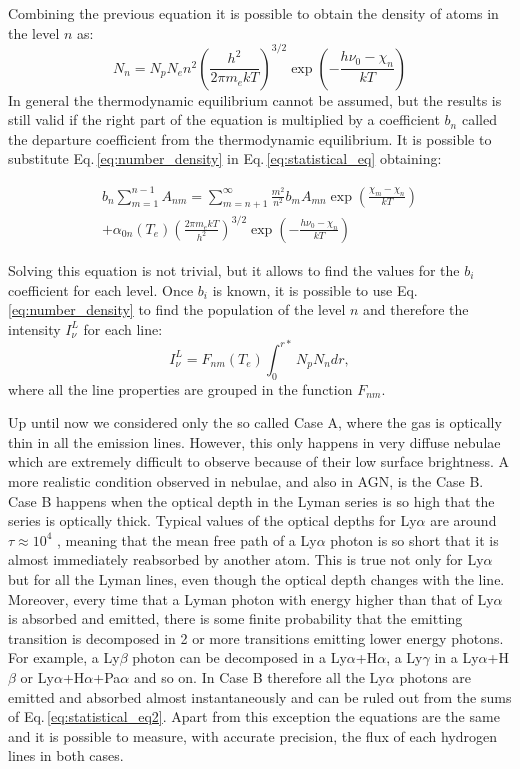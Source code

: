 \documentclass[../main.tex]{subfiles}
\begin{document}
Combining the previous equation it is possible to obtain the density of atoms in the level $n$ as:
\begin{equation}
    \label{eq:number_density}
    N_n = N_pN_en^2\left(\frac{h^2}{2\pi m_e k T}\right)^{3/2} \exp\left(-\frac{h\nu_0 -\chi_n}{kT}\right)
\end{equation}
In general the thermodynamic equilibrium cannot be assumed, but the results is still valid if the right part of the equation is multiplied by a coefficient $b_n$ called the departure coefficient from the thermodynamic equilibrium. It is possible to substitute Eq.\,\ref{eq:number_density} in Eq.\,\ref{eq:statistical_eq} obtaining:

\begin{multline}
    \label{eq:statistical_eq2}
    b_n \sum\limits_{m=1}^{n-1} A_{nm} = \sum\limits_{m=n+1}^{\infty} \frac{m^2}{n^2}b_m A_{mn} \exp\left(\frac{\chi_m-\chi_n}{kT}\right) \\
    + \alpha_{0n}(T_e)\left(\frac{2\pi m_e kT}{h^2}\right)^{3/2}\exp\left(-\frac{h\nu_0 - \chi_n}{kT}\right)
\end{multline}

Solving this equation is not trivial, but it allows to find the values for the $b_i$ coefficient for each level.
Once $b_i$ is known, it is possible to use Eq.\,\ref{eq:number_density} to find the population of the level $n$ and therefore the intensity $I^L_{\nu}$ for each line:
\begin{equation}
    \label{eq:emission_coef}
    I_{\nu}^L = F_{nm}(T_e)\int_0^{r*}N_pN_ndr,   
\end{equation}
where all the line properties are grouped in the function $F_{nm}$.

Up until now we considered only the so called Case A, where the gas is optically thin in all the emission lines.
However, this only happens in very diffuse nebulae which are extremely difficult to observe because of their low surface brightness.
A more realistic condition observed in nebulae, and also in AGN, is the Case B.
Case B happens when the optical depth in the Lyman series is so high that the series is optically thick.
Typical values of the optical depths for Ly$\alpha$ are around $\tau \approx 10^4$ \citep{OsterbrockAGN}, meaning that the mean free path of a Ly$\alpha$ photon is so short that it is almost immediately reabsorbed by another atom. 
This is true not only for Ly$\alpha$ but for all the Lyman lines, even though the optical depth changes with the line.
Moreover, every time that a Lyman photon with energy higher than that of Ly$\alpha$ is absorbed and emitted, there is some finite probability that the emitting transition is decomposed in 2 or more transitions emitting lower energy photons.
For example, a Ly$\beta$ photon can be decomposed in a Ly$\alpha$+H$\alpha$, a Ly$\gamma$ in a Ly$\alpha$+H$\beta$ or Ly$\alpha$+H$\alpha$+Pa$\alpha$ and so on.
In Case B therefore all the Ly$\alpha$ photons are emitted and absorbed almost instantaneously and can be ruled out from the sums of Eq.\,\ref{eq:statistical_eq2}.
Apart from this exception the equations are the same and it is possible to measure, with accurate precision, the flux of each hydrogen lines in both cases.
\end{document}
